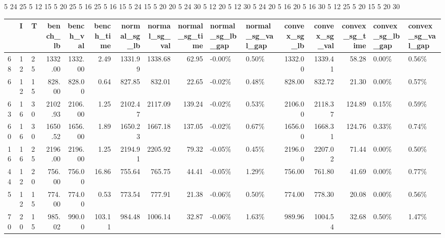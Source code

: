 5 24 25
5 12 15
5 20 25
5 16 25
5 16 15
5 24 15
5 20 20
5 24 30
5 12 20
5 12 30
5 24 20
5 16 20
5 16 30
5 12 25
5 20 15
5 20 30
\begin{tabular}{lllrrrrrrllrrrll}
\toprule
{} &   I &   T &  bench\_lb &  bench\_val &  bench\_time &  normal\_sg\_lb &  normal\_sg\_val &  normal\_sg\_time & normal\_sg\_lb\_gap & normal\_sg\_val\_gap &  convex\_sg\_lb &  convex\_sg\_val &  convex\_sg\_time & convex\_sg\_lb\_gap & convex\_sg\_val\_gap \\
\midrule
68 &  12 &  25 &   1332.00 &    1332.00 &        2.49 &       1331.99 &        1338.68 &           62.95 &           -0.00\% &             0.50\% &       1332.00 &        1339.41 &           58.28 &            0.00\% &             0.56\% \\
6  &  12 &  15 &    828.00 &     828.00 &        0.64 &        827.85 &         832.01 &           22.65 &           -0.02\% &             0.48\% &        828.00 &         832.72 &           21.30 &            0.00\% &             0.57\% \\
63 &  16 &  30 &   2102.93 &    2106.00 &        1.25 &       2102.47 &        2117.09 &          139.24 &           -0.02\% &             0.53\% &       2106.00 &        2118.37 &          124.89 &            0.15\% &             0.59\% \\
60 &  16 &  30 &   1650.52 &    1656.00 &        1.89 &       1650.23 &        1667.18 &          137.05 &           -0.02\% &             0.67\% &       1656.00 &        1668.31 &          124.76 &            0.33\% &             0.74\% \\
16 &  16 &  25 &   2196.00 &    2196.00 &        1.25 &       2194.91 &        2205.92 &           79.32 &           -0.05\% &             0.45\% &       2196.00 &        2207.02 &           71.44 &            0.00\% &             0.50\% \\
44 &  12 &  20 &    756.00 &     756.00 &       16.86 &        755.64 &         765.75 &           44.41 &           -0.05\% &             1.29\% &        756.00 &         761.80 &           41.69 &            0.00\% &             0.77\% \\
5  &  12 &  15 &    774.00 &     774.00 &        0.53 &        773.54 &         777.91 &           21.38 &           -0.06\% &             0.50\% &        774.00 &         778.30 &           20.08 &            0.00\% &             0.56\% \\
70 &  20 &  15 &    985.02 &     990.00 &      103.11 &        984.48 &        1006.14 &           32.87 &           -0.06\% &             1.63\% &        989.96 &        1004.54 &           32.68 &            0.50\% &             1.47\% \\

\end{tabular}
